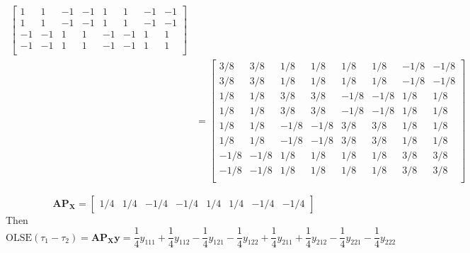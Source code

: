 \documentclass{article}
\begin{document}
\begin{enumerate}[leftmargin = 0 em, label = \arabic*., font = \bfseries]
\begin{enumerate}
\begin{align*}
\begin{bmatrix}
		1 & 1 & -1 & -1 & 1 & 1 & -1 & -1\\
		1 & 1 & -1 & -1 & 1 & 1 & -1 & -1\\
		-1 & -1 & 1 & 1 & -1 & -1 & 1 & 1\\
		-1 & -1 & 1 & 1 & -1 & -1 & 1 & 1\\
	\end{bmatrix}\\
	& = \begin{bmatrix}
		3/8 & 3/8 & 1/8 & 1/8 & 1/8 & 1/8 & -1/8 & -1/8\\
		3/8 & 3/8 & 1/8 & 1/8 & 1/8 & 1/8 & -1/8 & -1/8\\
		1/8 & 1/8 & 3/8 & 3/8 & -1/8 & -1/8 & 1/8 & 1/8\\
		1/8 & 1/8 & 3/8 & 3/8 & -1/8 & -1/8 & 1/8 & 1/8\\
		1/8 & 1/8 & -1/8 & -1/8 & 3/8 & 3/8 & 1/8 & 1/8\\
		1/8 & 1/8 & -1/8 & -1/8 & 3/8 & 3/8 & 1/8 & 1/8\\
		-1/8 & -1/8 & 1/8 & 1/8 & 1/8 & 1/8 & 3/8 & 3/8\\
		-1/8 & -1/8 & 1/8 & 1/8 & 1/8 & 1/8 & 3/8 & 3/8\\
	\end{bmatrix}
	\end{align*}

	\[\bm A \bm P_{\bm X} = \begin{bmatrix}
		1/4 & 1/4 & -1/4 & -1/4 & 1/4 & 1/4 & -1/4 & -1/4 
	\end{bmatrix}\]
	Then
	\[\mathrm{OLSE}(\tau_1 - \tau_2) = \bm A \bm P_{\bm X}\bm y = \frac{1}{4} y_{111} + \frac{1}{4}y_{112} - \frac{1}{4} y_{121} - \frac{1}{4} y_{122} + \frac{1}{4} y_{211} + \frac{1}{4} y_{212} - \frac{1}{4} y_{221} - \frac{1}{4} y_{222}\]
	
 	\end{enumerate}

\end{enumerate}
	
	
	
	
\end{document}
